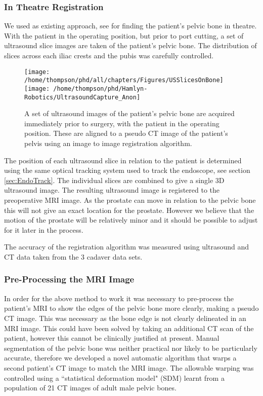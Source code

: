 \documentclass[3p,twocolumn,preprint,10pt]{elsarticle}
\begin{document}
\subsubsection{In Theatre Registration}
\label{sec:InTheatreReg}
We used as existing approach, see \cite{pap009} for 
finding the patient's pelvic bone in theatre. With the patient in the
operating position, but prior to port cutting, 
a set of ultrasound slice images are taken of the patient's pelvic bone. 
The distribution of slices across each iliac crests and the pubis was carefully 
controlled. 
\begin{figure*}
\begin{center}
\texttt{[image: /home/thompson/phd/all/chapters/Figures/USSlicesOnBone]}
\texttt{[image: /home/thompson/phd/Hamlyn-Robotics/UltrasoundCapture\_Anon]}
\end{center}
\caption{\label{fig:Ultrsound}A set of ultrasound images of the patient's pelvic bone 
are acquired immediately prior to surgery, with the patient in the operating position. These
are aligned to a pseudo CT image of the patient's pelvis using an image to image registration 
algorithm.}
\end{figure*}

The position of each ultrasound slice in relation to the patient
is determined using the same optical tracking system used to track the 
endoscope, see section \ref{sec:EndoTrack}.
The individual slices are combined to give a single 3D ultrasound image. 
The resulting ultrasound image is registered to the preoperative MRI image.
As the prostate can move in relation to the
pelvic bone this will not give an exact location for the prostate. However we believe
that the motion of the prostate will be relatively minor and it should be possible to 
adjust for it later in the process.

The accuracy of the registration algorithm was measured using ultrasound and CT data 
taken from the 3 cadaver data sets.

\subsubsection{Pre-Processing the MRI Image}
In order for the above method to work it was necessary to pre-process the patient's MRI to 
show the edges of the pelvic bone more clearly, making a pseudo CT image.
This was necessary as the bone edge is not 
clearly delineated in an MRI image. This could have been solved by taking an
additional CT scan of the patient, however this cannot be clinically justified at present. 
Manual segmentation of the pelvic bone was neither practical nor likely to be 
particularly accurate, therefore we developed a novel automatic 
algorithm that warps a second patient's CT image to match the MRI image. 
The allowable warping was controlled using a ``statistical deformation model" (SDM) learnt 
from a population of 21 CT images of adult male pelvic bones.
\end{document}
